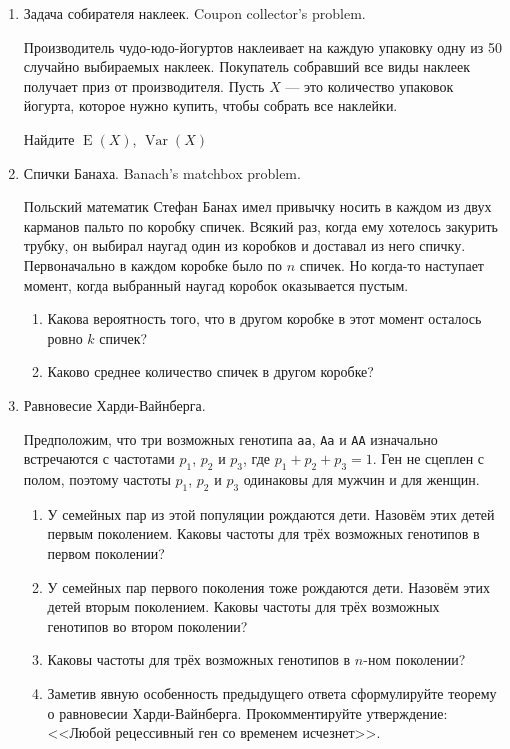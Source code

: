 \documentclass[nobib]{tufte-handout}
\DeclareMathOperator{\Var}{Var}
\DeclareMathOperator{\E}{E}
\begin{document}
\begin{enumerate}
\item Задача собирателя наклеек. Coupon collector's problem. 

Производитель чудо-юдо-йогуртов наклеивает на каждую упаковку одну из 50 случайно выбираемых наклеек. Покупатель собравший все виды наклеек получает приз от производителя. Пусть $X$ --- это количество упаковок йогурта, которое нужно купить, чтобы собрать все наклейки.

Найдите  $\E(X)$, $\Var(X)$

\item Спички Банаха. Banach's matchbox problem.

Польский математик Стефан Банах имел привычку носить в каждом из двух карманов пальто по коробку спичек. Всякий раз, когда ему хотелось закурить трубку, он выбирал наугад один из коробков и доставал из него спичку. Первоначально в каждом коробке было по $n$ спичек. Но когда-то наступает момент, когда выбранный наугад коробок оказывается пустым.

\begin{enumerate}
\item Какова вероятность того, что в другом коробке в этот момент осталось ровно $k$ спичек?
\item Каково среднее количество спичек в другом коробке?
\end{enumerate}


\item Равновесие Харди-Вайнберга. 

Предположим, что три возможных генотипа \verb|aa|, \verb|Aa| и \verb|AA| изначально встречаются с частотами $p_1$, $p_2$ и $p_3$, где $p_1+p_2+p_3=1$. Ген не сцеплен с полом, поэтому частоты $p_1$, $p_2$ и $p_3$ одинаковы для мужчин и для женщин. 
\begin{enumerate}
\item У семейных пар из этой популяции рождаются дети. Назовём этих детей первым поколением. Каковы частоты для трёх возможных генотипов в первом поколении? 
\item У семейных пар первого поколения тоже рождаются дети. Назовём этих детей вторым поколением. Каковы частоты для трёх возможных генотипов во втором поколении? 
\item Каковы частоты для трёх возможных генотипов в $n$-ном поколении?
\item Заметив явную особенность предыдущего ответа сформулируйте теорему о равновесии Харди-Вайнберга. Прокомментируйте утверждение: <<Любой рецессивный ген со временем исчезнет>>.
\end{enumerate}


\end{enumerate}
\end{document}
